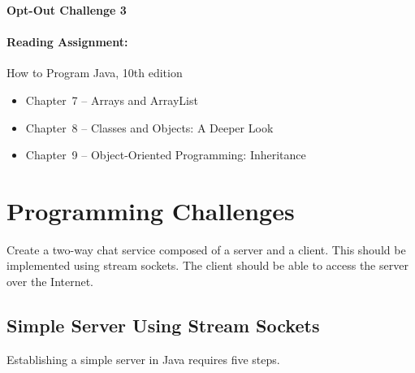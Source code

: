 \documentclass[11pt]{article}
\begin{document}
\begin{center}
{\bfseries \LARGE Opt-Out Challenge 3}
\end{center}

\paragraph{Reading Assignment:}
How to Program Java, 10th edition
\begin{itemize}
\item Chapter~7 -- Arrays and ArrayList
\item Chapter~8 -- Classes and Objects: A Deeper Look
\item Chapter~9 -- Object-Oriented Programming: Inheritance
\end{itemize}


\section*{Programming Challenges}

Create a two-way chat service composed of a server and a client.
This should be implemented using stream sockets.
The client should be able to access the server over the Internet.


\subsection*{Simple Server Using Stream Sockets}

Establishing a simple server in Java requires five steps.
\end{document}
